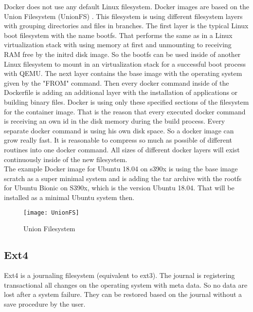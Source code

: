 Docker does not use any default Linux filesystem. 
Docker images are based on the Union Filesystem (UnionFS) \cite[~p.21]{Ashraf2015}. 
This filesystem is using different filesystem layers with grouping directories and files in branches. 
The first layer is the typical Linux boot filesystem with the name bootfs. 
That performs the same as in a Linux virtualization stack with using memory at first and unmounting to receiving RAM free by the initrd disk image. 
So the bootfs can be used inside of another Linux filesystem to mount in an virtualization stack for a successful boot process with QEMU.
The next layer contains the base image with the operating system given by the "FROM" command.
Then every docker command inside of the Dockerfile is adding an additional layer with the installation of applications or building binary files. 
Docker is using only these specified sections of the filesystem for the container image.
That is the reason that every executed docker command is receiving an own id in the disk memory during the build process.
Every separate docker command is using his own disk space. So a docker image can grow really fast.
It is reasonable to compress so much as possible of different routines into one docker command. 
All sizes of different docker layers will exist continuously inside of the new filesystem. \\
The example Docker image for Ubuntu 18.04 on s390x is using the base image scratch as a super minimal system and is adding the tar archive with the rootfs for Ubuntu Bionic on S390x, which is the version Ubuntu 18.04. That will be installed as a minimal Ubuntu system then.

\begin{figure}[H]
\centering
\texttt{[image: UnionFS]}
 \caption{Union Filesystem}
    \label{UnionFilesytem}
\end{figure}

\subsection{Ext4}

Ext4 is a journaling filesystem (equivalent to ext3). The journal is registering transactional all changes on the operating system with meta data.
So no data  are lost after a system failure. They can be restored based on the journal without a save procedure by the user.

